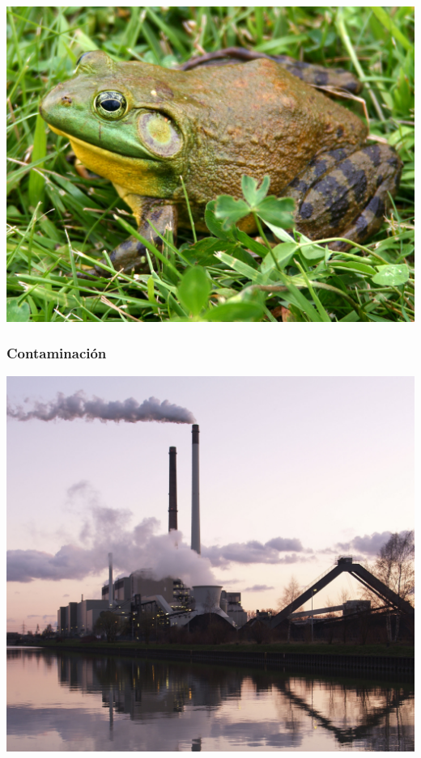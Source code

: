 \documentclass[
]{article}
\begin{document}
\includegraphics{figures/bullfrog1.jpg}

\hypertarget{contaminaciuxf3n}{%
\subsubsection{Contaminación}\label{contaminaciuxf3n}}

\includegraphics{figures/pollution1.png}

\hypertarget{section}{%
\subsection{}\label{section}}
\end{document}
